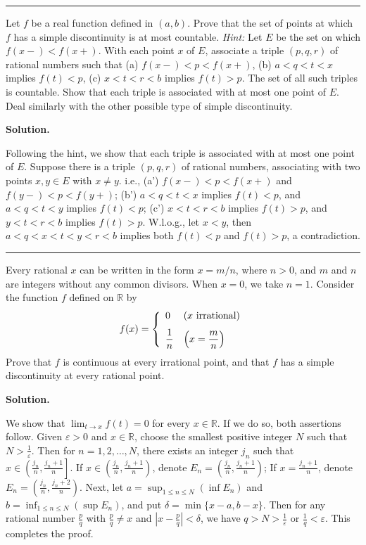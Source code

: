 \documentclass[12pt]{article}
\theoremstyle{definition}
\begin{document}
\bigskip\noindent\hrule\bigskip

Let $f$ be a real function defined in $(a,b)$. Prove that the set of points at which $f$ has a simple discontinuity is at most countable. \textit{Hint:} Let $E$ be the set on which $f(x-)<f(x+)$. With each point $x$ of $E$, associate a triple $(p,q,r)$ of rational numbers such that
(a) $f(x-)<p<f(x+)$,
(b) $a<q<t<x$ implies $f(t)<p$,
(c) $x<t<r<b$ implies $f(t)>p$.
The set of all such triples is countable. Show that each triple is associated with at most one point of $E$. Deal similarly with the other possible type of simple discontinuity.

\smallskip
\noindent\textbf{Solution.}\quad

Following the hint, we show that each triple is associated with at most one point of $E$. Suppose there is a triple $(p,q,r)$ of rational numbers, associating with two points $x,y\in E$ with $x\ne y$. i.e.,
(a') $f(x-)<p<f(x+)$ and $f(y-)<p<f(y+)$;
(b') $a<q<t<x$ implies $f(t)<p$, and $a<q<t<y$ implies $f(t)<p$;
(c') $x<t<r<b$ implies $f(t)>p$, and $y<t<r<b$ implies $f(t)>p$.
W.l.o.g., let $x<y$, then $a<q<x<t<y<r<b$ implies both $f(t)<p$ and $f(t)>p$, a contradiction.



\bigskip\noindent\hrule\bigskip

Every rational $x$ can be written in the form $x=m/n$, where $n>0$, and $m$ and $n$ are integers without any common divisors. When $x=0$, we take $n=1$. Consider the function $f$ defined on $\mathbb{R}$ by
\begin{align*}
f(x)=\left\{\begin{array}{ll}
0&\mbox{($x$ irrational)} \vspace{0.1in}\\
\dfrac{1}{n}&\mbox{$\left(x=\dfrac{m}{n}\right)$}
\end{array}\right.
\end{align*}
Prove that $f$ is continuous at every irrational point, and that $f$ has a simple discontinuity at every rational point.

\smallskip
\noindent\textbf{Solution.}\quad

We show that $\lim_{t\to x}f(t)=0$ for every $x\in \mathbb{R}$. If we do so, both assertions follow. Given $\varepsilon>0$ and $x\in \mathbb{R}$, choose the smallest positive integer $N$ such that $N>\frac{1}{\varepsilon}$. Then for $n=1,2,\ldots,N$, there exists an integer $j_n$ such that $x\in\left(\tfrac{j_n}{n},\tfrac{j_n+1}{n}\right]$. If $x\in\left(\tfrac{j_n}{n},\tfrac{j_n+1}{n}\right)$, denote $E_n=\left(\tfrac{j_n}{n},\tfrac{j_n+1}{n}\right)$; If $x=\frac{j_n+1}{n}$, denote $E_n=\left(\tfrac{j_n}{n},\tfrac{j_n+2}{n}\right)$. Next, let $a=\sup_{1\le n\le N}\left(\inf E_n\right)$ and $b=\inf_{1\le n\le N}\left(\sup E_n\right)$, and put $\delta=\min\{x-a,b-x\}$. Then for any rational number $\frac{p}{q}$ with $\frac{p}{q}\ne x$ and $\left\vert x-\frac{p}{q}\right\vert<\delta$, we have $q>N>\frac{1}{\varepsilon}$ or $\frac{1}{q}<\varepsilon$. This completes the proof.
\end{document}
